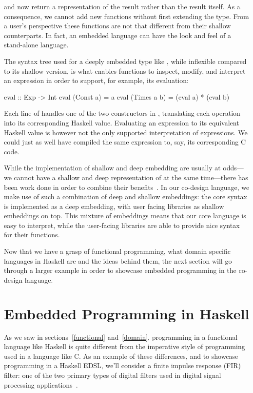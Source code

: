 \documentclass[../paper.tex]{subfiles}
\begin{document}
\noindent {} and  now return a representation of the result rather than the result itself. As a consequence, we cannot add new functions without first extending the  type. From a user's perspective these functions are not that different from their shallow counterparts. In fact, an embedded language can have the look and feel of a stand-alone language.

The syntax tree used for a deeply embedded type like , while inflexible compared to its shallow version, is what enables functions to inspect, modify, and interpret an expression in order to support, for example, its evaluation:

\begin{code}
eval :: Exp -> Int
eval (Const a)   = a
eval (Times a b) = (eval a) * (eval b)
\end{code}

\noindent Each line of  handles one of the two constructors in , translating each operation into its corresponding Haskell value. Evaluating an expression to its equivalent Haskell value is however not the only supported interpretation of expressions. We could just as well have compiled the same expression to, say, its corresponding C code.

While the implementation of shallow and deep embedding are usually at odds---we cannot have a shallow and deep representation of  at the same time---there has been work done in order to combine their benefits~\cite{svenningsson2012}. In our co-design language, we make use of such a combination of deep and shallow embeddings: the core syntax is implemented as a deep embedding, with user facing libraries as shallow embeddings on top. This mixture of embeddings means that our core language is easy to interpret, while the user-facing libraries are able to provide nice syntax for their functions.

Now that we have a grasp of functional programming, what domain specific languages in Haskell are and the ideas behind them, the next section will go through a larger example in order to showcase embedded programming in the co-design language.

\section{Embedded Programming in Haskell}
\label{embedded}

As we saw in sections~\ref{functional} and~\ref{domain}, programming in a functional language like Haskell is quite different from the imperative style of programming used in a language like C. As an example of these differences, and to showcase programming in a Haskell EDSL, we'll consider a finite impulse response (FIR) filter: one of the two primary types of digital filters used in digital signal processing applications~\cite{oppenheim1989}.
\end{document}
